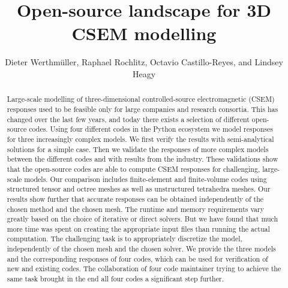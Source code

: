\documentclass[
    paper,
  ]{geophysics}
\begin{document}
\title{Open-source landscape for 3D CSEM modelling}

\ms{}

\address{
  \footnotemark[1]TU Delft, Building 23, Stevinweg 1 / PO-box 5048, 2628 CN Delft (NL);\\
  \footnotemark[2]Leibniz Institut for Applied Geophysics, Stilleweg 2, 30655 Hannover (DE);\\
  \footnotemark[3]Barcelona Supercomputing Center (BSC), Nexus II Building c/Jordi Girona, 29, 08034 Barcelona (ES);\\
  \footnotemark[4]University of California Berkeley, Department of Statistics (USA).\\
  E-mail: \href{mailto:Dieter@Werthmuller.org}{Dieter@Werthmuller.org};\\
  \textbf{Keywords}: CSEM, Open-Source, 3D modelling, FV, FE.
}
\author{%
  Dieter Werthmüller\footnotemark[1],          %
  Raphael Rochlitz\footnotemark[2],            %
  Octavio Castillo-Reyes\footnotemark[3], and  %
  Lindsey Heagy\footnotemark[4]                %
}

\footer{}

\maketitle

\begin{abstract}
Large-scale modelling of three-dimensional controlled-source electromagnetic (CSEM) responses used to be feasible only for large companies and research consortia. This has changed over the last few years, and today there exists a selection of different open-source codes. Using four different codes in the Python ecosystem we model responses for three increasingly complex models. We first verify the results with semi-analytical solutions for a simple case. Then we validate the responses of more complex models between the different codes and with results from the industry. These validations show that the open-source codes are able to compute CSEM responses for challenging, large-scale models. Our comparison includes finite-element and finite-volume codes using structured tensor and octree meshes as well as unstructured tetrahedra meshes. Our results show further that accurate responses can be obtained independently of the chosen method and the chosen mesh. The runtime and memory requirements vary greatly based on the choice of iterative or direct solvers. But we have found that much more time was spent on creating the appropriate input files than running the actual computation. The challenging task is to appropriately discretize the model, independently of the chosen mesh and the chosen solver. We provide the three models and the corresponding responses of four codes, which can be used for verification of new and existing codes. The collaboration of four code maintainer trying to achieve the same task brought in the end all four codes a significant step further.
\end{abstract}
\end{document}
